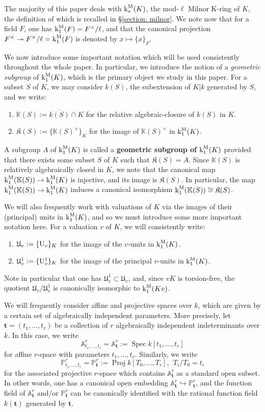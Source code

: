 \documentclass[11pt]{amsart}
\theoremstyle{definition}
\theoremstyle{remark}
\numberwithin{equation}{section}
\DeclareMathOperator{\Spec}{Spec}
\DeclareMathOperator{\Proj}{Proj}
\newcommand{\U}{{\rm U}}
\newcommand{\Abb}{\mathbb{A}}
\newcommand{\Pbb}{\mathbb{P}}
\newcommand{\Kbb}{\mathbb{K}}
\newcommand{\tbf}{\mathbf{t}}
\newcommand{\Kfrak}{\mathfrak{K}}
\newcommand{\Ufrak}{\mathfrak{U}}
\renewcommand{\k}{\operatorname{k}^{\rm M}}
\begin{document}
The majority of this paper deals with $\k_*(K)$, the mod-$\ell$ Milnor K-ring of $K$, the definition of which is recalled in \S\ref{section: milnor}.
We note now that for a field $F$, one has $\k_1(F) = F^\times/\ell$, and that the canonical projection $F^\times \twoheadrightarrow F^\times/\ell = \k_1(F)$ is denoted by $x \mapsto \{x\}_F$.

We now introduce some important notation which will be used consistently throughout the whole paper.
In particular, we introduce the notion of a \emph{geometric subgroup} of $\k_1(K)$, which is the primary object we study in this paper.
For a subset $S$ of $K$, we may consider $k(S)$, the subextension of $K|k$ generated by $S$, and we write:
\begin{enumerate}
  \item $\Kbb(S) := \overline{k(S)} \cap K$ for the relative algebraic-closure of $k(S)$ in $K$.
  \item $\Kfrak(S) := \{\Kbb(S)^\times\}_K$ for the image of $\Kbb(S)^\times$ in $\k_1(K)$.
\end{enumerate}
A subgroup $A$ of $\k_1(K)$ is called a {\bf geometric subgroup of $\k_1(K)$} provided that there exists some subset $S$ of $K$ such that $\Kfrak(S) = A$.
Since $\Kbb(S)$ is relatively algebraically closed in $K$, we note that the canonical map $\k_1(\Kbb(S)) \rightarrow \k_1(K)$ is injective, and its image is $\Kfrak(S)$.
In particular, the map $\k_1(\Kbb(S)) \rightarrow \k_1(K)$ induces a canonical isomorphism $\k_1(\Kbb(S)) \cong \Kfrak(S)$.

We will also frequently work with valuations of $K$ via the images of their (principal) units in $\k_1(K)$, and so we must introduce some more important notation here.
For a valuation $v$ of $K$, we will consistently write:
\begin{enumerate}
  \item $\Ufrak_v := \{\U_v\}_K$ for the image of the $v$-units in $\k_1(K)$.
  \item $\Ufrak_v^1 := \{\U_v^1\}_K$ for the image of the principal $v$-units in $\k_1(K)$.
\end{enumerate}
Note in particular that one has $\Ufrak_v^1 \subset \Ufrak_v$, and, since $vK$ is torsion-free, the quotient $\Ufrak_v/\Ufrak_v^1$ is canonically isomorphic to $\k_1(Kv)$.

We will frequently consider affine and projective spaces over $k$, which are given by a certain set of algebraically independent parameters.
More precisely, let $\tbf = (t_1,\ldots,t_r)$ be a collection of $r$ algebraically independent indeterminants over $k$.
In this case, we write 
\[ \Abb^r_{t_1,\ldots,t_r} = \Abb^r_\tbf := \Spec k[t_1,\ldots,t_r] \]
for affine $r$-space with parameters $t_1,\ldots,t_r$.
Similarly, we write 
\[ \Pbb^r_{t_1,\ldots,t_r} = \Pbb^r_\tbf := \Proj k[T_0,\ldots,T_r], \ \ T_i/T_0 = t_i \]
for the associated projective $r$-space which contains $\Abb^r_\tbf$ as a standard open subset.
In other words, one has a canonical open embedding $\Abb^r_\tbf \hookrightarrow \Pbb^r_\tbf$, and the function field of $\Abb^r_\tbf$ and/or $\Pbb^r_\tbf$ can be canonically identified with the rational function field $k(\tbf)$ generated by $\tbf$.
\end{document}
